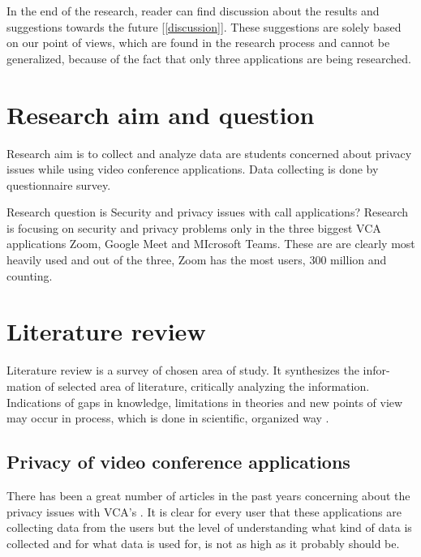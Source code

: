 \documentclass[utf8,english]{gradu3}
\begin{document}
%
In the end of the research, reader can find discussion about the results and suggestions towards the future [\ref{discussion}]. These suggestions are solely based on our point of views, which are found in the research process and cannot be generalized, because of the fact that only three applications are being researched.


\chapter{Research aim and question}
\label{researchquestion}
Research aim is to collect and analyze data are students concerned about privacy issues while using video conference applications. Data collecting is done by questionnaire survey.

Research question is Security and privacy issues with call applications?
Research is focusing on security and privacy problems only in the three biggest VCA applications Zoom, Google Meet and MIcrosoft Teams. These are are clearly most heavily used and out of the three, Zoom has the most users, 300 million and counting.


\chapter{Literature review}
\label{literatureReview}
Literature review is a survey of chosen area of study. It synthesizes the infor-
mation of selected area of literature, critically analyzing the information. Indications of gaps in knowledge, limitations in theories and new points of view may occur in process, which is done in scientific, organized way \parencite{literatureRoyal}.

\section{Privacy of video conference applications}
There has been a great number of articles in the past years concerning about the privacy issues with VCA's \parencite{vcadata}. It is clear for every user that these applications are collecting data from the users but the level of understanding what kind of data is collected and for what data is used for, is not as high as it probably should be.
\end{document}
